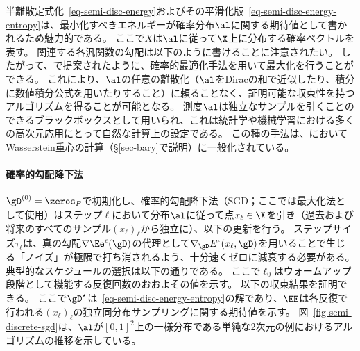 半離散定式化~\eqref{eq-semi-disc-energy}およびその平滑化版~\eqref{eq-semi-disc-energy-entropy}は、最小化すべきエネルギーが確率分布$\al$に関する期待値として書かれるため魅力的である。
ここで$X$は$\al$に従って$\X$上に分布する確率ベクトルを表す。
%
関連する各汎関数の勾配は以下のように書けることに注意されたい。
%
したがって、\citet{genevay2016stochastic}で提案されたように、確率的最適化手法を用いて最大化を行うことができる。
%
これにより、$\al$の任意の離散化（$\al$をDiracの和で近似したり、積分に数値積分公式を用いたりすること）に頼ることなく、証明可能な収束性を持つアルゴリズムを得ることが可能となる。
%
測度$\al$は独立なサンプルを引くことのできるブラックボックスとして用いられ、これは統計学や機械学習における多くの高次元応用にとって自然な計算上の設定である。
%
この種の手法は、\citep{staib2017parallel}においてWasserstein重心の計算（\S\ref{sec-bary}で説明）に一般化されている。

\paragraph{確率的勾配降下法}

$\gD^{(0)} = \zeros_{P}$で初期化し、確率的勾配降下法（SGD；ここでは最大化法として使用）はステップ$\ell$において分布$\al$に従って点$x_\ell \in \X$を引き（過去および将来のすべてのサンプル$(x_\ell)_\ell$から独立に）、以下の更新を行う。
ステップサイズ$\tau_\ell$は、真の勾配$\nabla \Ee^\epsilon(\gD)$の代理として$\nabla_{\gD} E^\epsilon(x_\ell,\gD)$を用いることで生じる「ノイズ」が極限で打ち消されるよう、十分速くゼロに減衰する必要がある。
%
典型的なスケジュールの選択は以下の通りである。
ここで$\ell_0$はウォームアップ段階として機能する反復回数のおおよその値を示す。
%
以下の収束結果を証明できる。
ここで$\gD^\star$は~\eqref{eq-semi-disc-energy-entropy}の解であり、$\EE$は各反復で行われる$(x_\ell)_\ell$の独立同分布サンプリングに関する期待値を示す。
%
図~\ref{fig-semi-discrete-sgd}は、$\al$が$[0,1]^2$上の一様分布である単純な2次元の例におけるアルゴリズムの推移を示している。


